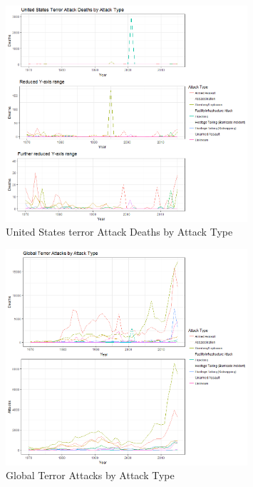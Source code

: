 \documentclass[10pt,a4paper]{article}
\begin{document}
\begin{center}
\begin{figure}[h!]
		
	\includegraphics[width=0.8\textwidth]{Plots/AttackType/Deaths.png}
	\caption{United States terror Attack Deaths by Attack Type}
	
\end{figure}

\begin{figure}[h!]

		
	\includegraphics[width=0.8\textwidth]{Plots/AttackType/Global.png}
	\caption{Global Terror Attacks by Attack Type}
	
\end{figure}

\begin{figure}[h!]


\end{figure}
\end{center}
\end{document}
